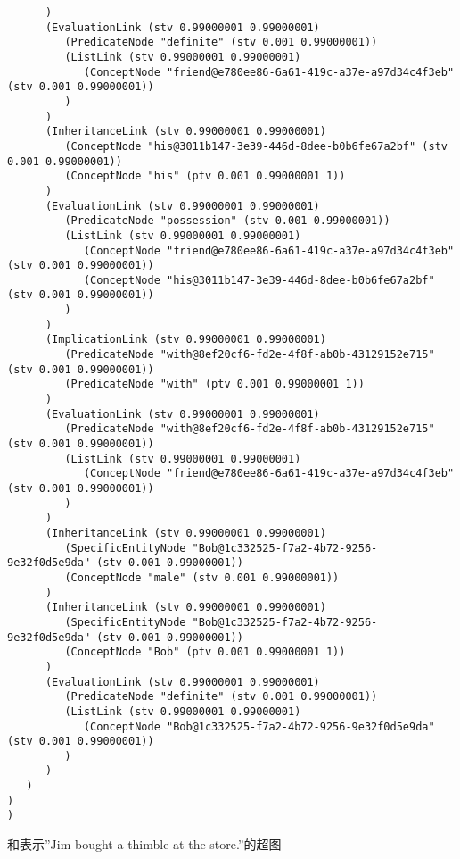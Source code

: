 {\begin{tiny}
\begin{lstlisting}
      )
      (EvaluationLink (stv 0.99000001 0.99000001)
         (PredicateNode "definite" (stv 0.001 0.99000001))
         (ListLink (stv 0.99000001 0.99000001)
            (ConceptNode "friend@e780ee86-6a61-419c-a37e-a97d34c4f3eb" (stv 0.001 0.99000001))
         )
      )
      (InheritanceLink (stv 0.99000001 0.99000001)
         (ConceptNode "his@3011b147-3e39-446d-8dee-b0b6fe67a2bf" (stv 0.001 0.99000001))
         (ConceptNode "his" (ptv 0.001 0.99000001 1))
      )
      (EvaluationLink (stv 0.99000001 0.99000001)
         (PredicateNode "possession" (stv 0.001 0.99000001))
         (ListLink (stv 0.99000001 0.99000001)
            (ConceptNode "friend@e780ee86-6a61-419c-a37e-a97d34c4f3eb" (stv 0.001 0.99000001))
            (ConceptNode "his@3011b147-3e39-446d-8dee-b0b6fe67a2bf" (stv 0.001 0.99000001))
         )
      )
      (ImplicationLink (stv 0.99000001 0.99000001)
         (PredicateNode "with@8ef20cf6-fd2e-4f8f-ab0b-43129152e715" (stv 0.001 0.99000001))
         (PredicateNode "with" (ptv 0.001 0.99000001 1))
      )
      (EvaluationLink (stv 0.99000001 0.99000001)
         (PredicateNode "with@8ef20cf6-fd2e-4f8f-ab0b-43129152e715" (stv 0.001 0.99000001))
         (ListLink (stv 0.99000001 0.99000001)
            (ConceptNode "friend@e780ee86-6a61-419c-a37e-a97d34c4f3eb" (stv 0.001 0.99000001))
         )
      )
      (InheritanceLink (stv 0.99000001 0.99000001)
         (SpecificEntityNode "Bob@1c332525-f7a2-4b72-9256-9e32f0d5e9da" (stv 0.001 0.99000001))
         (ConceptNode "male" (stv 0.001 0.99000001))
      )
      (InheritanceLink (stv 0.99000001 0.99000001)
         (SpecificEntityNode "Bob@1c332525-f7a2-4b72-9256-9e32f0d5e9da" (stv 0.001 0.99000001))
         (ConceptNode "Bob" (ptv 0.001 0.99000001 1))
      )
      (EvaluationLink (stv 0.99000001 0.99000001)
         (PredicateNode "definite" (stv 0.001 0.99000001))
         (ListLink (stv 0.99000001 0.99000001)
            (ConceptNode "Bob@1c332525-f7a2-4b72-9256-9e32f0d5e9da" (stv 0.001 0.99000001))
         )
      )
   )
)
)

\end{lstlisting}\end{tiny}}

和表示”Jim bought a thimble at the store.”的超图


